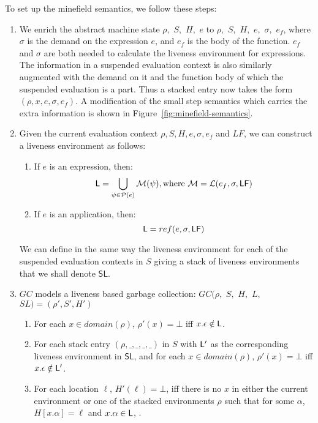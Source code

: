 \documentclass[9pt]{sigplanconf}
\begin{document}
To set up the minefield semantics, we follow these steps:
\begin{enumerate}
\item We enrich  the abstract machine state $\rho,$ $S,$  $ H,$ $e$ to
  $\rho,$ $S,$ $H,$ $e,$ $\sigma,$ $e_f$, where $\sigma$ is the demand
  on the expression $e$, and $e_f$  is the body of the function. $e_f$
  and $\sigma$ are  both needed to calculate  the liveness environment
  for expressions.  The information  in a suspended evaluation context
  is also similarly  augmented with the demand on it  and the function
  body of  which the suspended evaluation  is a part.  Thus  a stacked
  entry now takes the form $(\rho, x, e, \sigma, e_f)$. A modification
  of the small  step semantics which carries the  extra information is
  shown in Figure~\ref{fig:minefield-semantics}.
\item Given  the current  evaluation context $\rho,  S, H,  e, \sigma,
  e_f$ and $LF$, we can construct a liveness environment as follows:
  \begin{enumerate}
  \item If $e$ is an expression, then:  
  $$ \mathsf{L} = \bigcup_{\psi \in \mathcal{P}(e)} \mathcal{M}(\psi),
    \text{where }
  \mathcal{M} = \mathcal{L}(e_f, \sigma, \mathsf{LF})$$
\item If $e$ is an application, then:  
  $$ \mathsf{L} = ref(e, \sigma, \mathsf{LF})$$
  \end{enumerate}
We can define in the same way the liveness environment for each of the
suspended  evaluation contexts in  $S$  giving  a  stack of  liveness
environments that we shall denote $\mathsf{SL}$.
\item $GC$ models a liveness based garbage collection:
$GC(\rho,$ $ S,$ $ H,$ $ L,$ $ SL) = (\rho', S', H')$ 
  \begin{enumerate}
  \item For each $x \in domain(\rho)$,  $\rho'(x)=\bot$ iff $x.\epsilon
    \notin \mathsf{L}$.
\item For each stack entry $(\rho,\_,\_,\_,\_)$ in $S$ with $\mathsf{L}'$ as
  the corresponding liveness environment in $\mathsf{SL}$,  and for each $x
  \in domain(\rho)$,  $\rho'(x)=\bot$
  iff $x.\epsilon \notin \mathsf{L}'$.
\item For each location $\ell$, $H'(\ell) = \bot$, iff  there is no
  $x$ in either the current environment or one of the stacked
  environments $\rho$ such that for some $\alpha$, $H[x.\alpha] =
  \ell$  and $x.\alpha \in \mathsf{L}$, .
  \end{enumerate}
\end{enumerate}
\end{document}
